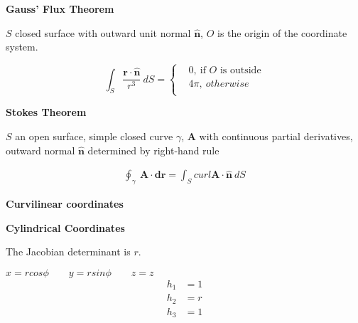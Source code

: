 \documentclass{article}
\begin{document}
\noindent
\textbf{Gauss' Flux Theorem}  

\begin{flushleft}
    $S$ closed surface with outward unit normal $\mathbf{\hat{n}}$, $O$ is the origin of the coordinate system.
\end{flushleft} 
\begin{equation}
    \int_S \frac{\mathbf{r} \cdot \mathbf{\hat{n}}}{r^3} \ dS= 
    \begin{cases}
        & 0, \ \text{if $O$ is outside} \\
        & 4\pi, \ otherwise \\
    \end{cases}
\end{equation}  
\newline

\noindent
\textbf{Stokes Theorem}
\begin{flushleft}
    $S$ an open surface, simple closed curve $\gamma$, $\mathbf{A}$ with continuous partial derivatives, 
    outward normal $\mathbf{\hat{n}}$ determined by right-hand rule
\end{flushleft} 
\begin{align*}
    \oint_{\gamma} \  \mathbf{A} \cdot \mathbf{dr} = \int_{S} curl \mathbf{A} \cdot \mathbf{\hat{n}} \ dS
\end{align*}  
\newline

\noindent
\Large \textbf{Curvilinear coordinates}  
\newline
\newline

\textbf{Cylindrical Coordinates}  

The Jacobian determinant is $r$.  

$x = r cos \phi \qquad y = rsin \phi \qquad z=z$
\begin{align*}
    h_1 &= 1 \\
    h_2 &= r \\ 
    h_3 &= 1 \\
\end{align*}
\end{document}
